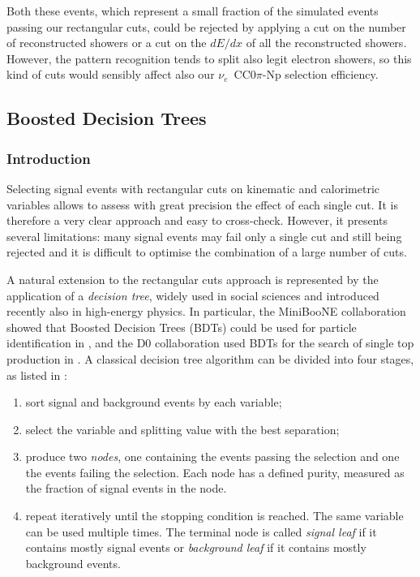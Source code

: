 Both these events, which represent a small fraction of the simulated events passing our rectangular cuts, could be rejected by applying a cut on the number of reconstructed showers or a cut on the $dE/dx$ of all the reconstructed showers. However, the pattern recognition tends to split also legit electron showers, so this kind of cuts would sensibly affect also our $\nu_e$~CC0$\pi$-Np selection efficiency.

\subsection{Boosted Decision Trees}\label{sec:bdt}
\subsubsection*{Introduction}
Selecting signal events with rectangular cuts on kinematic and calorimetric variables allows to assess with great precision the effect of each single cut. It is therefore a very clear approach and easy to cross-check. However, it presents several limitations: many signal events may fail only a single cut and still being rejected and it is difficult to optimise the combination of a large number of cuts. 

A natural extension to the rectangular cuts approach is represented by the application of a \emph{decision tree}, widely used in social sciences and introduced recently also in high-energy physics. In particular, the MiniBooNE collaboration showed that Boosted Decision Trees (BDTs) could be used for particle identification in \cite{Yang:2005nz}, and the D0 collaboration used BDTs for the search of single top production in \cite{Abazov:2006gd}.
A classical decision tree algorithm can be divided into four stages, as listed in \cite{Coadou:2013lca}:
\begin{enumerate}
    \item sort signal and background events by each variable;
    \item select the variable and splitting value with the best separation;
    \item produce two \emph{nodes}, one containing the events passing the selection and one the events failing the selection. Each node has a defined purity, measured as the fraction of signal events in the node.
    \item repeat iteratively until the stopping condition is reached. The same variable can be used multiple times. The terminal node is called \emph{signal leaf} if it contains mostly signal events or \emph{background leaf} if it contains mostly background events.
\end{enumerate}

